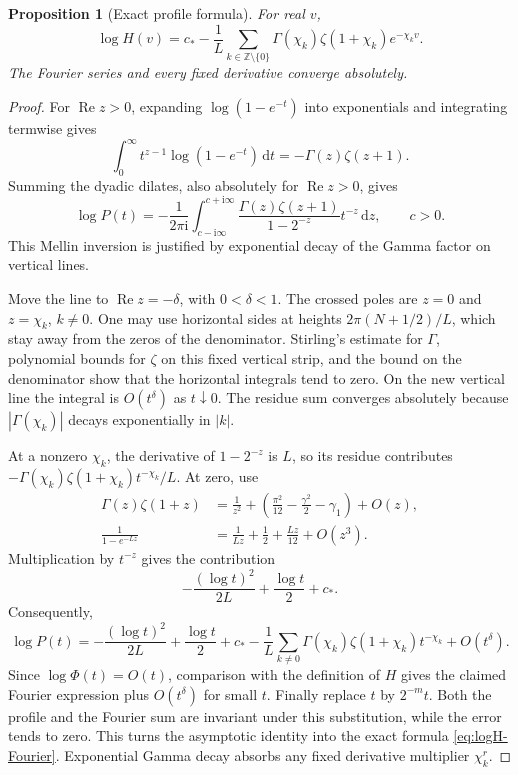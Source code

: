 \documentclass[11pt,a4paper]{article}
\numberwithin{equation}{section}
\newtheorem{proposition}[proposition]{Proposition}
\theoremstyle{definition}
\theoremstyle{remark}
\newcommand{\Z}{\mathbb Z}
\newcommand{\ii}{\mathrm i}
\newcommand{\dd}{\,\mathrm d}
\newcommand{\Rea}{\operatorname{Re}}
\newcommand{\abs}[1]{\left|#1\right|}
\begin{document}
\begin{proposition}[Exact profile formula]
\label{prop:logH}
For real $v$,
\begin{equation}
 \boxed{\displaystyle
 \log H(v)=c_*-\frac1L\sum_{k\in\Z\setminus\{0\}}
       \Gamma(\chi_k)\zeta(1+\chi_k)e^{-\chi_kv}.}
 \label{eq:logH-Fourier}
\end{equation}
The Fourier series and every fixed derivative converge absolutely.
\end{proposition}
\begin{proof}
For $\Rea z>0$, expanding $\log(1-e^{-t})$ into exponentials and
integrating termwise gives
\[
 \int_0^\infty t^{z-1}\log(1-e^{-t})\dd t
 =-\Gamma(z)\zeta(z+1).
\]
Summing the dyadic dilates, also absolutely for $\Rea z>0$, gives
\begin{equation}
 \log P(t)=-\frac1{2\pi\ii}
 \int_{c-\ii\infty}^{c+\ii\infty}
 \frac{\Gamma(z)\zeta(z+1)}{1-2^{-z}}t^{-z}\dd z,
 \qquad c>0.
 \label{eq:logP-Mellin}
\end{equation}
This Mellin inversion is justified by exponential decay of the
Gamma factor on vertical lines.

Move the line to $\Rea z=-\delta$, with $0<\delta<1$.
The crossed poles are $z=0$ and $z=\chi_k$, $k\ne0$.
One may use horizontal sides at heights
$2\pi(N+1/2)/L$, which stay away from the zeros of the denominator.
Stirling's estimate for $\Gamma$, polynomial bounds for $\zeta$
on this fixed vertical strip, and the bound on the denominator show
that the horizontal integrals tend to zero. On the new vertical
line the integral is $O(t^\delta)$ as $t\downarrow0$.
The residue sum converges absolutely because
$\abs{\Gamma(\chi_k)}$ decays exponentially in $\abs k$.

At a nonzero $\chi_k$, the derivative of $1-2^{-z}$ is $L$, so
its residue contributes
$-\Gamma(\chi_k)\zeta(1+\chi_k)t^{-\chi_k}/L$.
At zero, use
\begin{align*}
 \Gamma(z)\zeta(1+z)
 &=\frac1{z^2}+\left(\frac{\pi^2}{12}
             -\frac{\gamma^2}{2}-\gamma_1\right)+O(z),\\
 \frac1{1-e^{-Lz}}&=\frac1{Lz}+\frac12+\frac{Lz}{12}+O(z^3).
\end{align*}
Multiplication by $t^{-z}$ gives the contribution
\[
 -\frac{(\log t)^2}{2L}+\frac{\log t}{2}+c_*.
\]
Consequently,
\[
 \log P(t)=-\frac{(\log t)^2}{2L}+\frac{\log t}{2}+c_*
 -\frac1L\sum_{k\ne0}\Gamma(\chi_k)\zeta(1+\chi_k)t^{-\chi_k}
 +O(t^\delta).
\]
Since $\log\Phi(t)=O(t)$, comparison with the definition of $H$
gives the claimed Fourier expression plus $O(t^\delta)$ for small
$t$. Finally replace $t$ by $2^{-m}t$. Both the profile and the
Fourier sum are invariant under this substitution, while the error
tends to zero. This turns the asymptotic identity into the exact
formula \cref{eq:logH-Fourier}. Exponential Gamma decay absorbs any
fixed derivative multiplier $\chi_k^r$.
\end{proof}
\end{document}
